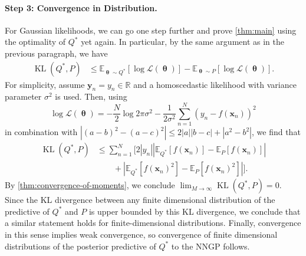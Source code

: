 \documentclass[twoside]{article}
\newcommand{\vx}{\mathbf{x}}
\newcommand{\vy}{\mathbf{y}}
\newcommand{\vtheta}{\bm{\uptheta}}
\newcommand{\E}{\mathbb{E}}
\renewcommand{\P}{\mathbb{P}}
\newcommand{\Q}{\mathbb{Q}}
\renewcommand{\Q}{\ensuremath{Q}}
\renewcommand{\P}{\ensuremath{P}}
\newcommand{\R}{\mathbb{R}}
\newcommand{\KL}{\operatorname{KL}}
\DeclarePairedDelimiter\parens{(}{)}             %
\theoremstyle{theoremstyle}
\begin{document}
\paragraph{Step 3: Convergence in Distribution.}
For Gaussian likelihoods, we can go one step further and prove \cref{thm:main} using the optimality of $\Q^*$ yet again. In particular, by the same argument as in the previous paragraph, we have 
\begin{align}
\!\KL(Q^*, P) &\leq\! \mathbb{E}_{\vtheta\sim Q^*}[\log \mathcal{L}(\vtheta)] -\mathbb{E}_{\vtheta\sim P}[\log \mathcal{L}(\vtheta)].
\end{align}
For simplicity, assume $\vy_n=y_n \in \R$ and a homoscedastic likelihood with variance parameter $\sigma^2$ is used. Then, using
\begin{equation}
   \log \mathcal{L}(\vtheta)= -\frac{N}{2}\log 2 \pi\sigma^2-  \frac{1}{2\sigma^2}\sum_{n=1}^N (y_n-f(\vx_n))^2
\end{equation} 
in combination with $|(a - b)^2 - (a - c)^2| \le 2|a||b - c| + |a^2 - b^2|$, we find that
\begin{align}
\KL(Q^*, P) &\leq \sum_{n=1}^N \Big[ 2|y_n| |\E_{\Q^*}[f(\vx_n)] - \E_{\P}[f(\vx_n)]| \nonumber \\ &\qquad + |\E_{\Q^*}[f(\vx_n)^2] - \E_{\P}[f(\vx_n)^2]| \Big].
\end{align}
By \cref{thm:convergence-of-moments}, we conclude $\lim_{M \to \infty} \KL(\Q^*,\P) = 0$. Since the KL divergence between any finite dimensional distribution of the predictive of $\Q^*$ and $\P$ is upper bounded by this KL divergence, we conclude that a similar statement holds for finite-dimensional distributions. Finally, convergence in this sense implies weak convergence, so convergence of finite dimensional distributions of the posterior predictive of $\Q^*$ to the NNGP follows. 

\end{document}
